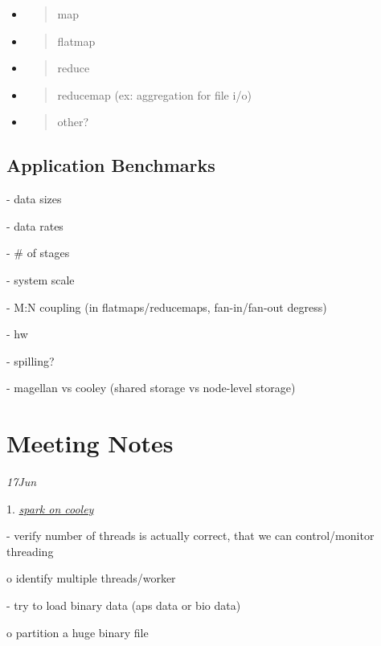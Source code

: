 \documentclass{sig-alternate}
\begin{document}
\begin{itemize}
\item
  \begin{quote}
  map
  \end{quote}
\item
  \begin{quote}
  flatmap
  \end{quote}
\item
  \begin{quote}
  reduce
  \end{quote}
\item
  \begin{quote}
  reducemap (ex: aggregation for file i/o)
  \end{quote}
\item
  \begin{quote}
  other?
  \end{quote}
\end{itemize}

\subsection{Application Benchmarks}\label{application-benchmarks}

- data sizes

- data rates

- \# of stages

- system scale

- M:N coupling (in flatmaps/reducemaps, fan-in/fan-out degress)

- hw

- spilling?

- magellan vs cooley (shared storage vs node-level storage)

\section{Meeting Notes}\label{meeting-notes}

\emph{17Jun}

1.
\href{https://docs.google.com/document/d/1fq3z1-oEcCBhjKA__vl8LsVm3-uArJik7YFLYvYoN1Y/edit?usp=sharing}{\emph{spark
on cooley}}

- verify number of threads is actually correct, that we can
control/monitor threading

o identify multiple threads/worker

- try to load binary data (aps data or bio data)

o partition a huge binary file
\end{document}
